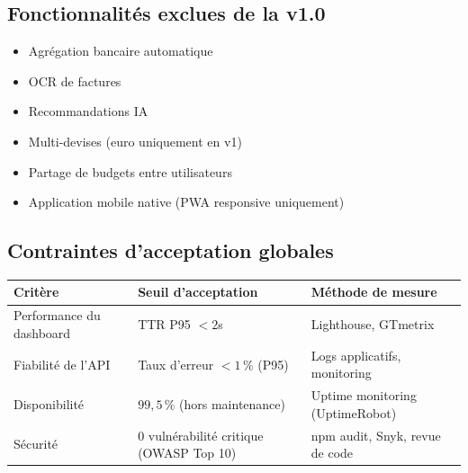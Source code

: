 \subsection{Fonctionnalités exclues de la v1.0}

\begin{itemize}
  \item Agrégation bancaire automatique
  \item OCR de factures
  \item Recommandations IA
  \item Multi-devises (euro uniquement en v1)
  \item Partage de budgets entre utilisateurs
  \item Application mobile native (PWA responsive uniquement)
\end{itemize}

\subsection{Contraintes d'acceptation globales}

\begin{center}
\begin{tabular}{|p{4cm}|p{4cm}|p{5cm}|}
\hline
\textbf{Critère} & \textbf{Seuil d'acceptation} & \textbf{Méthode de mesure} \\
\hline
Performance du dashboard & TTR P95 $< 2$s & Lighthouse, GTmetrix \\
\hline
Fiabilité de l'API & Taux d'erreur $< 1\,\%$ (P95) & Logs applicatifs, monitoring \\
\hline
Disponibilité & $99{,}5\,\%$ (hors maintenance) & Uptime monitoring (UptimeRobot) \\
\hline
Sécurité & 0 vulnérabilité critique (OWASP Top 10) & npm audit, Snyk, revue de code \\
\hline
\end{tabular}
\end{center}

